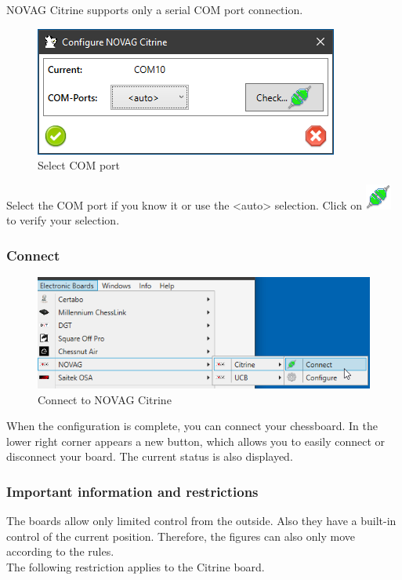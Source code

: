 \documentclass[11pt,a4paper]{article}
\begin{document}
NOVAG Citrine supports only a serial COM port connection.

\begin{figure}[H]
	\centering
	\includegraphics[scale=1.0]{NovagCitrine2.png}
	\caption{Select COM port}
	\label{fig:NovagCtrine2}
\end{figure}

Select the COM port if you know it or use the <auto> selection. 
Click on \includegraphics[scale=0.5]{connect.png} to verify your selection.

\subsubsection{Connect}
\begin{figure}[H]
	\centering
	\includegraphics[scale=0.8]{NovagCitrine3.png}
	\caption{Connect to NOVAG Citrine}
	\label{fig:NovagCitrine3}
\end{figure}
When the configuration is complete, you can connect your chessboard.
In the lower right corner appears a new button, which allows you to easily connect or disconnect your board. The current status is also displayed.

\subsubsection{Important information and restrictions} \label{InformationNovagCitrine}
The boards allow only limited control from the outside. Also they have a built-in control of the current position. Therefore, the figures can also only move according to the rules.\\
The following restriction applies to the Citrine board.
\end{document}
